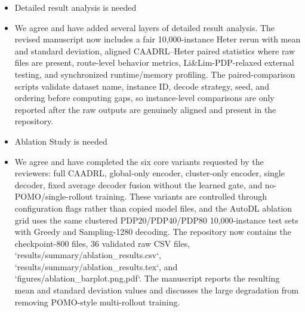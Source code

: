 \documentclass{article}
\begin{document}
\begin{itemize}
\item[\textbf{Comment. 1}] {Detailed result analysis is needed}


\item[\textbf{Response:}] We agree and have added several layers of detailed result analysis. The revised manuscript now includes a fair 10,000-instance Heter rerun with mean and standard deviation, aligned CAADRL--Heter paired statistics where raw files are present, route-level behavior metrics, Li\&Lim-PDP-relaxed external testing, and synchronized runtime/memory profiling. The paired-comparison scripts validate dataset name, instance ID, decode strategy, seed, and ordering before computing gaps, so instance-level comparisons are only reported after the raw outputs are genuinely aligned and present in the repository.


\item[\textbf{Comment. 2}] {Ablation Study is needed}

\item[\textbf{Response:}] We agree and have completed the six core variants requested by the reviewers: full CAADRL, global-only encoder, cluster-only encoder, single decoder, fixed average decoder fusion without the learned gate, and no-POMO/single-rollout training. These variants are controlled through configuration flags rather than copied model files, and the AutoDL ablation grid uses the same clustered PDP20/PDP40/PDP80 10,000-instance test sets with Greedy and Sampling-1280 decoding. The repository now contains the checkpoint-800 files, 36 validated raw CSV files, `results/summary/ablation_results.csv`, `results/summary/ablation_results.tex`, and `figures/ablation_barplot.{png,pdf}`. The manuscript reports the resulting mean and standard deviation values and discusses the large degradation from removing POMO-style multi-rollout training.


\end{itemize}

\vspace{0.5cm}



\end{document}
